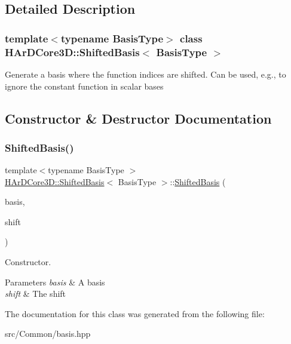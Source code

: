 \subsection{Detailed Description}
\subsubsection*{template$<$typename Basis\+Type$>$\newline
class H\+Ar\+D\+Core3\+D\+::\+Shifted\+Basis$<$ Basis\+Type $>$}

Generate a basis where the function indices are shifted. Can be used, e.\+g., to ignore the constant function in scalar bases 

\subsection{Constructor \& Destructor Documentation}
\mbox{\label{classHArDCore3D_1_1ShiftedBasis_aea075c3cb8fbdd848e30d84821f23711}} 
\subsubsection{\texorpdfstring{Shifted\+Basis()}{ShiftedBasis()}}
{\footnotesize\ttfamily template$<$typename Basis\+Type $>$ \\
\hyperlink{classHArDCore3D_1_1ShiftedBasis}{H\+Ar\+D\+Core3\+D\+::\+Shifted\+Basis}$<$ Basis\+Type $>$\+::\hyperlink{classHArDCore3D_1_1ShiftedBasis}{Shifted\+Basis} (\begin{DoxyParamCaption}\item[{const Basis\+Type \&}]{basis,  }\item[{const int}]{shift }\end{DoxyParamCaption})\hspace{0.3cm}{\ttfamily [inline]}}



Constructor. 


\begin{DoxyParams}{Parameters}
{\em basis} & A basis \\
\hline
{\em shift} & The shift \\
\hline
\end{DoxyParams}


The documentation for this class was generated from the following file\+:\begin{DoxyCompactItemize}
\item 
src/\+Common/basis.\+hpp\end{DoxyCompactItemize}
